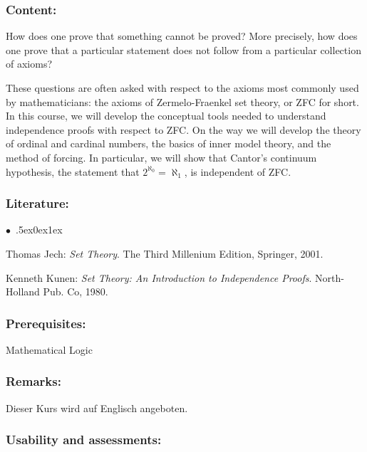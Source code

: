 \documentclass[a4paper,10pt]{article}
\renewenvironment{itemize}{\begin{list}{$\bullet$\ }{\itemsep.5ex\setlength{\topsep}{0.5\itemsep}\parsep0ex\labelsep1ex\settowidth{\labelwidth}{$\bullet$\ }\setlength{\leftmargin}{\labelwidth}\addtolength{\leftmargin}{3ex}\addtolength{\leftmargin}{\labelsep}}}{\end{list}}
\begin{document}
\subsubsection*{\large
    Content:
}
How does one prove that something cannot be proved? More precisely, how does one prove that a particular statement does not follow from a particular collection of axioms?

These questions are often asked with respect to the axioms most commonly used by mathematicians: the axioms of Zermelo-Fraenkel set theory, or ZFC for short. In this course, we will develop the conceptual tools needed to understand independence proofs with respect to ZFC. On the way we will develop the theory of ordinal and cardinal numbers, the basics of inner model theory, and the method of forcing. In particular, we will show that Cantor's continuum hypothesis, the statement that $2^{\aleph_0}=\aleph_1$, is independent of ZFC. 

\subsubsection*{\large
    Literature:
}
\begin{itemize}
\item Thomas Jech: \emph{Set Theory}. The Third Millenium Edition, Springer, 2001. 
\item Kenneth Kunen: \emph{Set Theory: An Introduction to Independence Proofs}. North-Holland Pub. Co, 1980.
\end{itemize}

\subsubsection*{\large
    Prerequisites:
}
Mathematical Logic
\subsubsection*{\large
    Remarks:
}
Dieser Kurs wird auf Englisch angeboten.
\subsubsection*{\large
    Usability and assessments:
}
\end{document}
